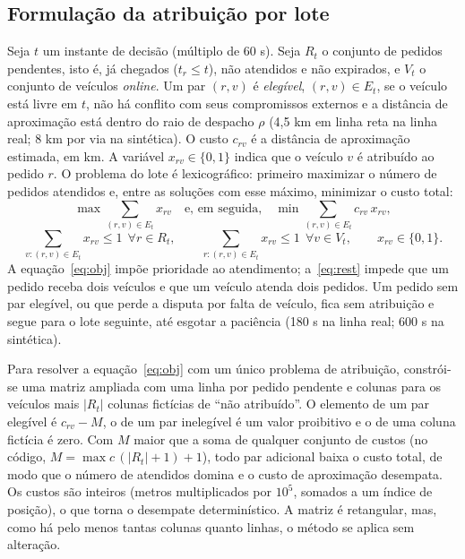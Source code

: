 \subsection{Formulação da atribuição por lote}

Seja $t$ um instante de decisão (múltiplo de 60 s). Seja $R_t$ o conjunto de pedidos pendentes, isto é, já chegados ($t_r \le t$), não atendidos e não expirados, e $V_t$ o conjunto de veículos \emph{online}. Um par $(r,v)$ é \emph{elegível}, $(r,v)\in E_t$, se o veículo está livre em $t$, não há conflito com seus compromissos externos e a distância de aproximação está dentro do raio de despacho $\rho$ (4,5 km em linha reta na linha real; 8 km por via na sintética). O custo $c_{rv}$ é a distância de aproximação estimada, em km. A variável $x_{rv}\in\{0,1\}$ indica que o veículo $v$ é atribuído ao pedido $r$. O problema do lote é lexicográfico: primeiro maximizar o número de pedidos atendidos e, entre as soluções com esse máximo, minimizar o custo total:
\begin{equation}
\max \sum_{(r,v)\in E_t} x_{rv} \quad\text{e, em seguida,}\quad \min \sum_{(r,v)\in E_t} c_{rv}\,x_{rv}, \label{eq:obj}
\end{equation}
\begin{equation}
\sum_{v:(r,v)\in E_t} x_{rv}\le 1\ \ \forall r\in R_t, \qquad \sum_{r:(r,v)\in E_t} x_{rv}\le 1\ \ \forall v\in V_t, \qquad x_{rv}\in\{0,1\}. \label{eq:rest}
\end{equation}
A equação~\ref{eq:obj} impõe prioridade ao atendimento; a~\ref{eq:rest} impede que um pedido receba dois veículos e que um veículo atenda dois pedidos. Um pedido sem par elegível, ou que perde a disputa por falta de veículo, fica sem atribuição e segue para o lote seguinte, até esgotar a paciência (180 s na linha real; 600 s na sintética).

Para resolver a equação~\ref{eq:obj} com um único problema de atribuição, constrói-se uma matriz ampliada com uma linha por pedido pendente e colunas para os veículos mais $|R_t|$ colunas fictícias de \enquote{não atribuído}. O elemento de um par elegível é $c_{rv}-M$, o de um par inelegível é um valor proibitivo e o de uma coluna fictícia é zero. Com $M$ maior que a soma de qualquer conjunto de custos (no código, $M=\max c\,(|R_t|+1)+1$), todo par adicional baixa o custo total, de modo que o número de atendidos domina e o custo de aproximação desempata. Os custos são inteiros (metros multiplicados por $10^5$, somados a um índice de posição), o que torna o desempate determinístico. A matriz é retangular, mas, como há pelo menos tantas colunas quanto linhas, o método se aplica sem alteração.

